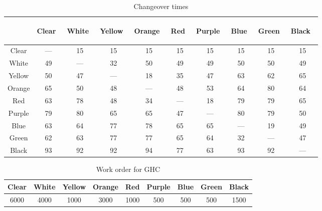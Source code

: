 \begin{table}[H]
\centering
\begin{tabular}{c|ccccccccc}
\hline
& \begin{sideways} Clear~ \end{sideways} & \begin{sideways} White~ \end{sideways} & \begin{sideways} Yellow~ \end{sideways} & \begin{sideways} Orange~ \end{sideways} & \begin{sideways} Red~ \end{sideways} & \begin{sideways} Purple~ \end{sideways} & \begin{sideways} Blue~ \end{sideways} & \begin{sideways} Green~ \end{sideways} & \begin{sideways} Black~ \end{sideways} \\ \hline
Clear & --- & 15 & 15 & 15 & 15 & 15 & 15 & 15 & 15 \\
White & 49 & --- & 32 & 50 & 49 & 49 & 50 & 50 & 49 \\
Yellow & 50 & 47 & --- & 18 & 35 & 47 & 63 & 62 & 65 \\
Orange & 65 & 50 & 48 & --- & 48 & 53 & 64 & 80 & 64 \\
Red & 63 & 78 & 48 & 34 & --- & 18 & 79 & 79 & 65 \\
Purple & 79 & 80 & 65 & 65 & 47 & --- & 80 & 79 & 50 \\
Blue & 63 & 64 & 77 & 78 & 65 & 65 & --- & 19 & 49 \\
Green & 62 & 63 & 77 & 77 & 65 & 64 & 32 & --- & 47 \\
Black & 93 & 92 & 92 & 94 & 77 & 63 & 93 & 92 & --- \\ \hline
\end{tabular}
\caption{Changeover times}
\label{table6-4}
\end{table}

\begin{table}[H]
\centering
\begin{tabular}{ccccccccc}
\hline
Clear & White & Yellow & Orange & Red & Purple & Blue & Green & Black \\ \hline
6000 & 4000 & 1000 & 3000 & 1000 & 500 & 500 & 500 & 1500 \\ \hline
\end{tabular}
\caption{Work order for GHC}
\label{table6-5}
\end{table}

